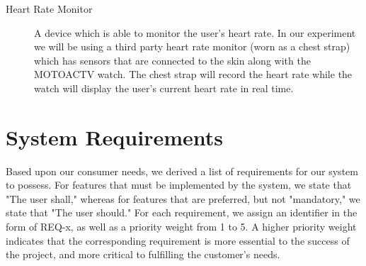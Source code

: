 \documentclass[letterpaper,english, 12pt]{scrreprt}
\begin{document}
\begin{description}
	\item[Heart Rate Monitor] A device which is able to monitor the user’s heart rate. In our experiment we will be using a third party heart rate monitor (worn as a chest strap) which has sensors that are connected to the skin along with the MOTOACTV watch. The chest strap will record the heart rate while the watch will display the user’s current heart rate in real time.
\end{description}

\chapter{System Requirements}
Based upon our consumer needs, we derived a list of requirements for our system to
possess. For features that must be implemented by the system, we state that "The
user shall," whereas for features that are preferred, but not "mandatory," we state
that "The user should." For each requirement, we assign an identifier in the form of
REQ-x, as well as a priority weight from 1 to 5. A higher priority weight indicates
that the corresponding requirement is more essential to the success of the project,
and more critical to fulfilling the customer's needs.
\end{document}
